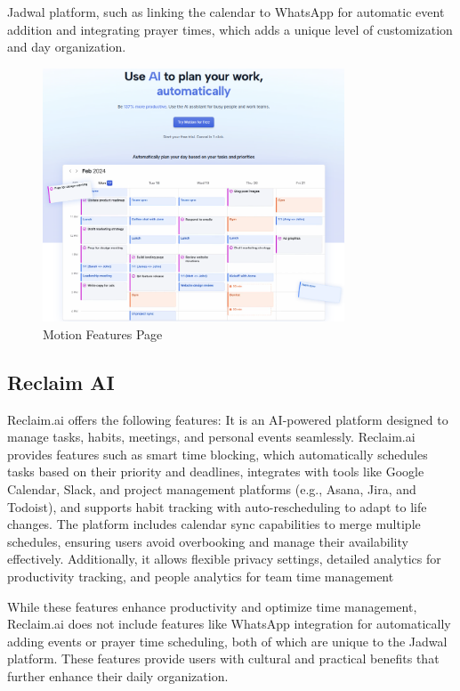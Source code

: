 \documentclass[12pt,a4paper]{report}
\begin{document}
Jadwal platform, such as linking the calendar to WhatsApp for automatic event addition and integrating prayer times, which adds a unique level of customization and day organization.

\begin{figure}[!h]
    \centering
    \includegraphics[width=0.8\textwidth]{images/competitors/Motion-features.png}
    \caption{Motion Features Page}
    \label{fig:Motion-features}
\end{figure}

\subsection{Reclaim AI}

Reclaim.ai offers the following features: It is an AI-powered platform designed to manage tasks, habits, meetings, and personal events seamlessly. Reclaim.ai provides features such as smart time blocking, which automatically schedules tasks based on their priority and deadlines, integrates with tools like Google Calendar, Slack, and project management platforms (e.g., Asana, Jira, and Todoist), and supports habit tracking with auto-rescheduling to adapt to life changes. The platform includes calendar sync capabilities to merge multiple schedules, ensuring users avoid overbooking and manage their availability effectively. Additionally, it allows flexible privacy settings, detailed analytics for productivity tracking, and people analytics for team time management

While these features enhance productivity and optimize time management, Reclaim.ai does not include features like WhatsApp integration for automatically adding events or prayer time scheduling, both of which are unique to the Jadwal platform. These features provide users with cultural and practical benefits that further enhance their daily organization.
\end{document}
